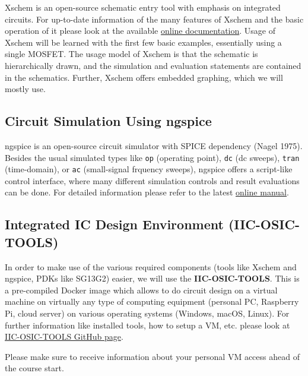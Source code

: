 \documentclass[
  a4paper,
  DIV=11,
  numbers=noendperiod]{scrartcl}
\begin{document}
Xschem is an open-source schematic entry tool with emphasis on
integrated circuits. For up-to-date information of the many features of
Xschem and the basic operation of it please look at the available
\href{https://xschem.sourceforge.io/stefan/xschem_man/xschem_man.html}{online
documentation}. Usage of Xschem will be learned with the first few basic
examples, essentially using a single MOSFET. The usage model of Xschem
is that the schematic is hierarchically drawn, and the simulation and
evaluation statements are contained in the schematics. Further, Xschem
offers embedded graphing, which we will mostly use.

\subsection{Circuit Simulation Using
ngspice}\label{circuit-simulation-using-ngspice}

ngspice is an open-source circuit simulator with SPICE dependency (Nagel
1975). Besides the usual simulated types like \texttt{op} (operating
point), \texttt{dc} (dc sweeps), \texttt{tran} (time-domain), or
\texttt{ac} (small-signal frquency sweeps), ngspice offers a script-like
control interface, where many different simulation controls and result
evaluations can be done. For detailed information please refer to the
latest
\href{https://ngspice.sourceforge.io/docs/ngspice-43-manual.pdf}{online
manual}.

\subsection{Integrated IC Design Environment
(IIC-OSIC-TOOLS)}\label{integrated-ic-design-environment-iic-osic-tools}

In order to make use of the various required components (tools like
Xschem and ngspice, PDKs like SG13G2) easier, we will use the
\textbf{IIC-OSIC-TOOLS}. This is a pre-compiled Docker image which
allows to do circuit design on a virtual machine on virtually any type
of computing equipment (personal PC, Raspberry Pi, cloud server) on
various operating systems (Windows, macOS, Linux). For further
information like installed tools, how to setup a VM, etc. please look at
\href{https://github.com/iic-jku/IIC-OSIC-TOOLS}{IIC-OSIC-TOOLS GitHub
page}.

\begin{tcolorbox}[enhanced jigsaw, breakable, title=\textcolor{quarto-callout-warning-color}{\faExclamationTriangle}\hspace{0.5em}{Preparation}, left=2mm, bottomrule=.15mm, opacitybacktitle=0.6, opacityback=0, colframe=quarto-callout-warning-color-frame, leftrule=.75mm, bottomtitle=1mm, colbacktitle=quarto-callout-warning-color!10!white, toprule=.15mm, rightrule=.15mm, toptitle=1mm, titlerule=0mm, arc=.35mm, colback=white, coltitle=black]

Please make sure to receive information about your personal VM access
ahead of the course start.

\end{tcolorbox}
\end{document}
